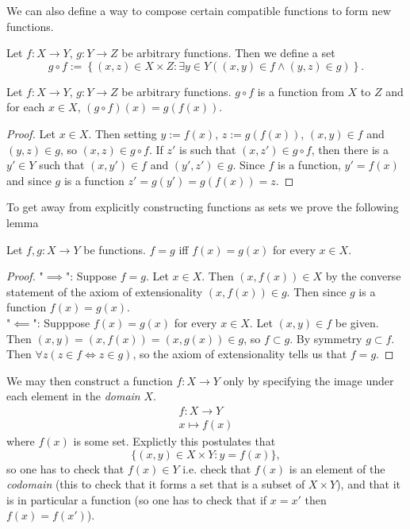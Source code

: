 We can also define a way to compose certain compatible functions to form new functions.
\begin{definition}
    Let $f: X\rightarrow Y$, $g:Y\rightarrow Z$ be arbitrary functions. Then we define a set 
    $$ g\circ f := \left\{(x,z)\in X\times Z: \exists y\in Y((x,y)\in f \wedge (y,z)\in g) \right\}.$$
\end{definition}
\begin{lemma}
    Let $f: X\rightarrow Y$, $g:Y\rightarrow Z$ be arbitrary functions. $g\circ f$ is a function from $X$ to $Z$ and for each $x\in X$, $(g\circ f)(x)=g(f(x))$.
\end{lemma}
\begin{proof}
    Let $x\in X$. Then setting $ y:= f(x)$, $z:= g(f(x))$, $(x,y)\in f$ and $(y,z)\in g$, so $(x,z)\in g\circ f$. If $z'$ is such that $(x,z')\in g\circ f$, then there is a $y'\in Y$ such that $(x,y')\in f$ and $(y',z')\in g$. Since $f$ is a function, $y'=f(x)$ and since $g$ is a function $z'=g(y')=g(f(x))=z$.
\end{proof}
To get away from explicitly constructing functions as sets we prove the following lemma
\begin{lemma}
    Let $f,g: X\rightarrow Y$ be functions. $f=g$ iff $f(x)=g(x)$ for every $x\in X$.  
\end{lemma}
\begin{proof}
    "$\implies$": Suppose $f=g$. Let $x\in X$. Then $(x,f(x))\in X$ by the converse statement of the axiom of extensionality $(x,f(x))\in g$. Then since $g$ is a function $f(x)=g(x)$.\\
    "$\impliedby$": Supppose $f(x)=g(x)$ for every $x\in X$. Let $(x,y)\in f$ be given. Then $(x,y)=(x,f(x))=(x,g(x))\in g$, so $f\subset g$. By symmetry $g\subset f$. Then $\forall z(z\in f\iff z\in g)$, so the axiom of extensionality tells us that $f=g$.
\end{proof}
We may then construct a function $f: X\rightarrow Y$ only by specifying the image under each element in the \textit{domain} $X$. 
\begin{gather*} 
    f : X \rightarrow Y\\
    x\mapsto f(x)
\end{gather*}
where $f(x)$ is some set. Explictly this postulates that  
$$\{(x,y)\in X\times Y : y=f(x)\},$$
so one has to check that $f(x)\in Y$ i.e. check that $f(x)$ is an element of the \textit{codomain} (this to check that it forms a set that is a subset of $X\times Y$), and that it is in particular a function (so one has to check that if $x=x'$ then $f(x)=f(x')$). 
